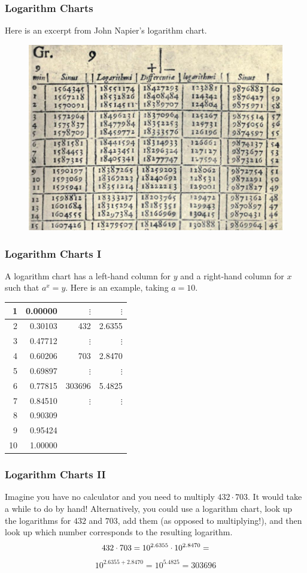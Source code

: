 \documentclass[xcolor=dvipsnames]{beamer}
\begin{document}
\begin{frame}
  \frametitle{Logarithm Charts}
Here is an excerpt from John Napier's logarithm chart.
  \begin{figure}[h]
    \includegraphics[scale=.3]{./napier.png}
  \end{figure}
\end{frame}

\begin{frame}
  \frametitle{Logarithm Charts I}
  A logarithm chart has a left-hand column for $y$ and a right-hand
  column for $x$ such that $a^{x}=y$. Here is an example, taking
  $a=10$.
\begin{tabular}{|r|r|r|r|}\hline
1  & 0.00000 & $\vdots$ & $\vdots$ \\ \hline
2  & 0.30103 & 432      & 2.6355   \\ \hline
3  & 0.47712 & $\vdots$ & $\vdots$ \\ \hline
4  & 0.60206 & 703      & 2.8470   \\ \hline
5  & 0.69897 & $\vdots$ & $\vdots$ \\ \hline
6  & 0.77815 & 303696   & 5.4825   \\ \hline
7  & 0.84510 & $\vdots$ & $\vdots$ \\ \hline
8  & 0.90309 &          &          \\ \hline
9  & 0.95424 &          &          \\ \hline
10 & 1.00000 &          & \\ \hline
\end{tabular}
\end{frame}

\begin{frame}
  \frametitle{Logarithm Charts II}
  Imagine you have no calculator and you need to multiply
  $432\cdot{}703$. It would take a while to do by hand! Alternatively,
  you could use a logarithm chart, look up the logarithms for $432$
  and $703$, add them (as opposed to multiplying!), and then look up
  which number corresponds to the resulting logarithm.
  \begin{equation}
    \label{eq:imohbise}
    432\cdot{}703=10^{2.6355}\cdot{}10^{2.8470}=\notag
  \end{equation}
  \begin{equation}
    \label{eq:maighaiw}
    10^{2.6355+2.8470}=10^{5.4825}=303696
  \end{equation}
\end{frame}
\end{document}
